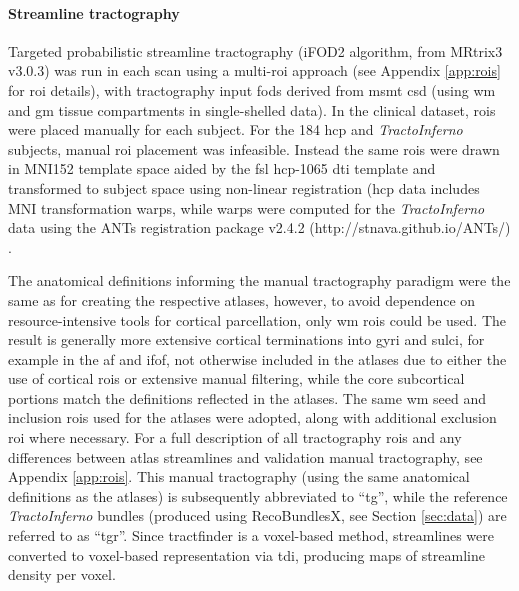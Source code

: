 \paragraph*{Streamline tractography}

Targeted probabilistic streamline tractography (iFOD2 algorithm\autocite{Tournier2010}, from MRtrix3\autocite{Tournier2019} v3.0.3)  was run in each scan using a multi-\gls{roi} approach (see Appendix \ref{app:rois} for \gls{roi} details),
with tractography input \glspl{fod} derived from \gls{msmt} \gls{csd}\autocite{Jeurissen2014} (using \gls{wm} and \gls{gm} tissue compartments in single-shelled data).
In the clinical dataset, \glspl{roi} were placed manually for each subject.
For the 184 \gls{hcp} and \textit{TractoInferno} subjects, manual \gls{roi} placement was infeasible.
Instead the same \glspl{roi} were drawn in MNI152 template space aided by the \gls{fsl} \gls{hcp}-1065 \gls{dti} template\autocite{FSLATLAS} and transformed to subject space using non-linear registration
(\gls{hcp} data includes MNI transformation warps, while warps were computed for the \textit{TractoInferno} data using the ANTs registration package v2.4.2 (http://stnava.github.io/ANTs/) \autocite{Tustison2013,Avants2011}.

The anatomical definitions informing the manual tractography paradigm were the same as for creating the respective atlases, however, to avoid dependence on resource-intensive tools for cortical parcellation, only \gls{wm} \glspl{roi} could be used.
The result is generally more extensive cortical terminations into gyri and sulci, for example in the \gls{af} and \gls{ifof}, not otherwise included in the atlases due to either the use of cortical \glspl{roi} or extensive manual filtering, while the core subcortical portions match the definitions reflected in the atlases.
The same \gls{wm} seed and inclusion \glspl{roi} used for the atlases were adopted, along with additional exclusion \gls{roi} where necessary.
For a full description of all tractography \glspl{roi} and any differences between atlas streamlines and validation manual tractography, see Appendix \ref{app:rois}.
This manual tractography (using the same anatomical definitions as the atlases) is subsequently abbreviated to ``\gls{tg}'', while the reference \textit{TractoInferno} bundles (produced using RecoBundlesX, see Section \ref{sec:data}) are referred to as ``\gls{tgr}''.
Since tractfinder is a voxel-based method, streamlines were converted to voxel-based representation via \gls{tdi}\autocite{Calamante2010}, producing maps of streamline density per voxel.

